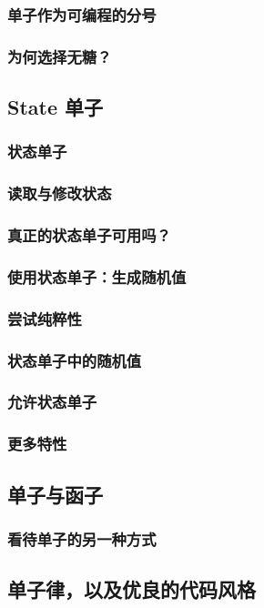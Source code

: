 \documentclass[./main.tex]{subfiles}
\begin{document}
\subsubsection*{单子作为可编程的分号}

\subsubsection*{为何选择无糖？}

\subsection*{State 单子}

\subsubsection*{状态单子}

\subsubsection*{读取与修改状态}

\subsubsection*{真正的状态单子可用吗？}

\subsubsection*{使用状态单子：生成随机值}

\subsubsection*{尝试纯粹性}

\subsubsection*{状态单子中的随机值}

\subsubsection*{允许状态单子}

\subsubsection*{更多特性}

\subsection*{单子与函子}

\subsubsection*{看待单子的另一种方式}

\subsection*{单子律，以及优良的代码风格}
\end{document}

